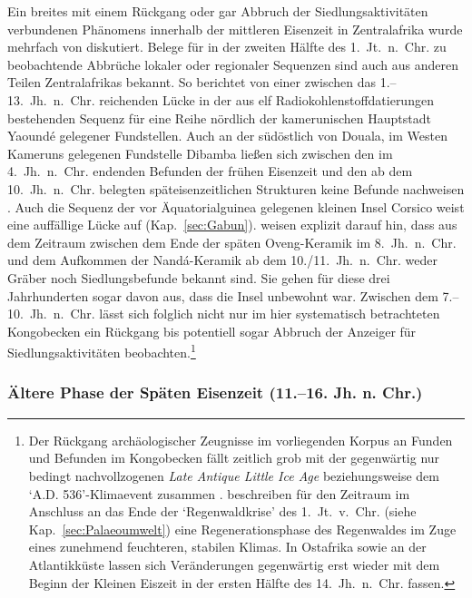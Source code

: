Ein breites mit einem Rückgang oder gar Abbruch der Siedlungsaktivitäten verbundenen Phänomens innerhalb der mittleren Eisenzeit in Zentralafrika wurde mehrfach von \textcites[101--103~Abb.~9]{Oslisly.1998}[112f.~Abb.~7.9]{Oslisly.2001d}{Oslisly.2013}{Oslisly.2013b} diskutiert. Belege für in der zweiten Hälfte des 1.~Jt.~n.~Chr. zu beobachtende Abbrüche lokaler oder regionaler Sequenzen sind auch aus anderen Teilen Zentralafrikas bekannt. So berichtet \textcite{Leka.2008} von einer zwischen das 1.--13.~Jh.~n.~Chr. reichenden Lücke in der aus elf Radiokohlenstoffdatierungen bestehenden Sequenz für eine Reihe nördlich der kamerunischen Hauptstadt Yaoundé gelegener Fundstellen. Auch an der südöstlich von Douala, im Westen Kameruns gelegenen Fundstelle Dibamba ließen sich zwischen den im 4.~Jh.~n.~Chr. endenden Befunden der frühen Eisenzeit und den ab dem 10.~Jh.~n.~Chr. belegten späteisenzeitlichen Strukturen keine Befunde nachweisen \parencites{Oslisly.2008}[377--380, 379 Abb.~36.6]{GouemGouem.20102011}. Auch die Sequenz der vor Äquatorialguinea gelegenen kleinen Insel Corsico weist eine auffällige Lücke auf (Kap.~\ref{sec:Gabun}). \textcite[355f.]{SanchezElipe.2016} weisen explizit darauf hin, dass aus dem Zeitraum zwischen dem Ende der späten Oveng-Keramik im 8.~Jh.~n.~Chr. und dem Aufkommen der Nandá-Keramik ab dem 10./11.~Jh.~n.~Chr. weder Gräber noch Siedlungsbefunde bekannt sind. Sie gehen für diese drei Jahrhunderten sogar davon aus, dass die Insel unbewohnt war. Zwischen dem 7.--10.~Jh.~n.~Chr. lässt sich folglich nicht nur im hier systematisch betrachteten Kongobecken ein Rückgang bis potentiell sogar Abbruch der Anzeiger für Siedlungsaktivitäten beobachten.\footnote{Der Rückgang archäologischer Zeugnisse im vorliegenden Korpus an Funden und Befunden im Kongobecken fällt zeitlich grob mit der gegenwärtig nur bedingt nachvollzogenen \textit{Late Antique Little Ice Age} beziehungsweise dem \enquote*{A.D. 536}-Klimaevent zusammen \parencites[siehe][]{Larsen.2008}{Buntgen.2016}. \textcite[337]{Hubau.2013} beschreiben für den Zeitraum im Anschluss an das Ende der \enquote*{Regenwaldkrise} des 1.~Jt.~v.~Chr. (siehe Kap.~\ref{sec:Palaeoumwelt}) eine Regenerationsphase des Regenwaldes im Zuge eines zunehmend feuchteren, stabilen Klimas. In Ostafrika sowie an der Atlantikküste  lassen sich Veränderungen gegenwärtig erst wieder mit dem Beginn der Kleinen Eiszeit in der ersten Hälfte des 14.~Jh.~n.~Chr. fassen.}

\subsubsection*{Ältere Phase der Späten Eisenzeit (11.--16. Jh. n. Chr.)}

